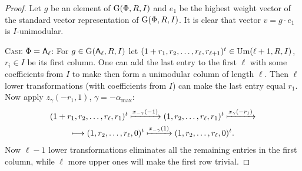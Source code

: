 \begin{proof}
Let $g$ be an element of $\operatorname{G}(\Phi, R, I)$ and $e_1$ be the highest weight vector of the standard vector representation of $\operatorname{G}(\Phi, R, I)$.
It is clear that vector $v=g\cdot e_1$ is $I$-unimodular.

\textsc{Case $\Phi=\mathsf{A}_\ell$:}
For $g\in\operatorname{G}(\mathsf{A}_\ell,R,I)$ let $(1+r_1,r_2,\ldots,r_\ell,r_{\ell+1})^t\in\operatorname{Um}(\ell+1,R,I)$, $r_i\in I$ be its first column.
One can add the last entry to the first $\ell$ with some coefficients from $I$ to make then form a unimodular column of length $\ell$.
Then $\ell$ lower transformations (with coefficients from $I$) can make the last entry equal $r_1$.
Now apply $z_\gamma(-r_1,1)$, $\gamma=-\alpha_{\max}$:
\begin{multline*}
(1+r_1,r_2,\ldots,r_\ell,r_1)^t\xmapsto{x_{-\gamma}(-1)}(1,r_2,\ldots,r_\ell,r_1)^t\xmapsto{x_\gamma(-r_1)}\\\longmapsto(1,r_2,\ldots,r_\ell,0)^t\xmapsto{x_{-\gamma}(1)}(1,r_2,\ldots,r_\ell,0)^t.
\end{multline*}
Now $\ell-1$ lower transformations eliminates all the remaining entries in the first column, while $\ell$ more upper ones will make the first row trivial.


\end{proof}
